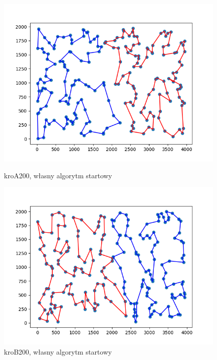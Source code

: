 \documentclass[11pt]{article}
\begin{document}
\begin{figure}[H]
    \vspace{0.5cm}

    \begin{minipage}[t]{0.45\textwidth}
        \centering
        \includegraphics[width=\linewidth]{best_paths/kroA200/traverse_greedy_shuffle/split_paths_regret_TSP}
        \caption{kroA200, własny algorytm startowy}
    \end{minipage}
    \hfill
    \begin{minipage}[t]{0.45\textwidth}
        \centering
        \includegraphics[width=\linewidth]{best_paths/kroB200/traverse_greedy_shuffle/split_paths_regret_TSP}
        \caption{kroB200, własny algorytm startowy}
    \end{minipage}
    \label{fig:minipage-greedy-vertex}
\end{figure}
\end{document}
